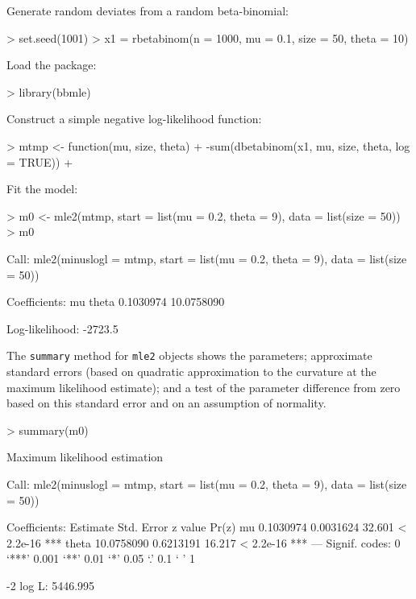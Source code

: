 \documentclass{article}
\newcommand{\code}[1]{{\tt #1}}
\begin{document}
Generate random deviates from a random beta-binomial:
\begin{Schunk}
\begin{Sinput}
> set.seed(1001)
> x1 = rbetabinom(n = 1000, mu = 0.1, size = 50, theta = 10)
\end{Sinput}
\end{Schunk}

Load the package:
\begin{Schunk}
\begin{Sinput}
> library(bbmle)
\end{Sinput}
\end{Schunk}

Construct a simple negative log-likelihood function:
\begin{Schunk}
\begin{Sinput}
> mtmp <- function(mu, size, theta) {
+     -sum(dbetabinom(x1, mu, size, theta, log = TRUE))
+ }
\end{Sinput}
\end{Schunk}

Fit the model:

\begin{Schunk}
\begin{Sinput}
> m0 <- mle2(mtmp, start = list(mu = 0.2, theta = 9), data = list(size = 50))
> m0
\end{Sinput}
\begin{Soutput}
Call:
mle2(minuslogl = mtmp, start = list(mu = 0.2, theta = 9), data = list(size = 50))

Coefficients:
        mu      theta 
 0.1030974 10.0758090 

Log-likelihood: -2723.5 
\end{Soutput}
\end{Schunk}

The \code{summary} method for \code{mle2} objects
shows the parameters; approximate standard
errors (based on quadratic approximation to the curvature at
the maximum likelihood estimate); and a test
of the parameter difference from zero based on
this standard error and on an assumption of normality.

\begin{Schunk}
\begin{Sinput}
> summary(m0)
\end{Sinput}
\begin{Soutput}
Maximum likelihood estimation

Call:
mle2(minuslogl = mtmp, start = list(mu = 0.2, theta = 9), data = list(size = 50))

Coefficients:
        Estimate Std. Error z value     Pr(z)    
mu     0.1030974  0.0031624  32.601 < 2.2e-16 ***
theta 10.0758090  0.6213191  16.217 < 2.2e-16 ***
---
Signif. codes:  0 ‘***’ 0.001 ‘**’ 0.01 ‘*’ 0.05 ‘.’ 0.1 ‘ ’ 1 

-2 log L: 5446.995 
\end{Soutput}
\end{Schunk}
\end{document}
